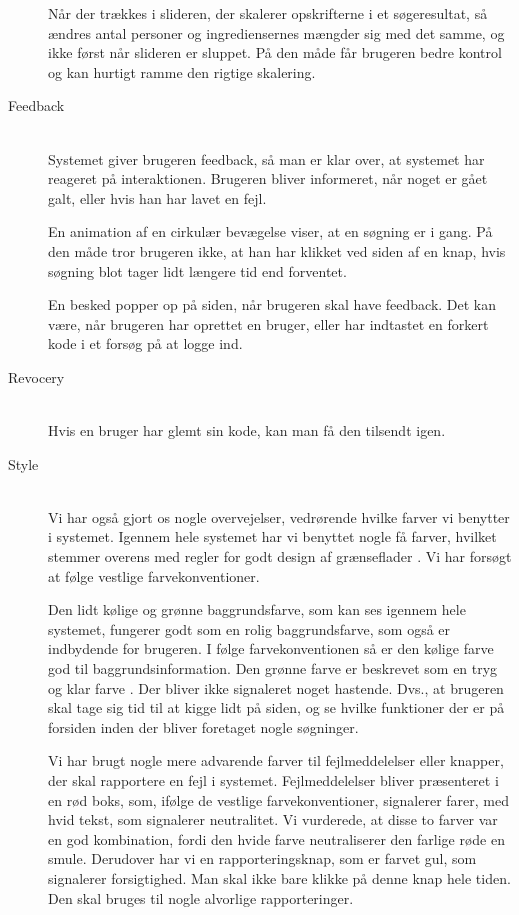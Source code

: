\begin{description}
Når der trækkes i slideren, der skalerer opskrifterne i et søgeresultat, så ændres antal personer og ingrediensernes mængder sig med det samme, og ikke først når slideren er sluppet. På den måde får brugeren bedre kontrol og kan hurtigt ramme den rigtige skalering.

\item[Feedback] \hfill \\
Systemet giver brugeren feedback, så man er klar over, at systemet har reageret på interaktionen. Brugeren bliver informeret, når noget er gået galt, eller hvis han har lavet en fejl.

En animation af en cirkulær bevægelse viser, at en søgning er i gang. På den måde tror brugeren ikke, at han har klikket ved siden af en knap, hvis søgning blot tager lidt længere tid end forventet.

En besked popper op på siden, når brugeren skal have feedback. Det kan \fx være, når brugeren har oprettet en bruger, eller har indtastet en forkert kode i et forsøg på at logge ind.

\item[Revocery] \hfill \\
Hvis en bruger har glemt sin kode, kan man få den tilsendt igen.

\item[Style] \hfill \\
Vi har også gjort os nogle overvejelser, vedrørende hvilke farver vi benytter i systemet. Igennem hele systemet har vi benyttet nogle få farver, hvilket stemmer overens med regler for godt design af grænseflader \cite[s. ~344]{deb}. Vi har forsøgt at følge vestlige farvekonventioner. 

Den lidt kølige og grønne baggrundsfarve, som kan ses igennem hele systemet, fungerer godt som en rolig baggrundsfarve, som også er indbydende for brugeren. I følge farvekonventionen så er den kølige farve god til baggrundsinformation. Den grønne farve er beskrevet som en tryg og klar farve \cite[s. ~344]{deb}. Der bliver ikke signaleret noget hastende. Dvs., at brugeren skal tage sig tid til at kigge lidt på siden, og se hvilke funktioner der er på forsiden inden der bliver foretaget nogle søgninger.

Vi har brugt nogle mere advarende farver til \fx fejlmeddelelser eller knapper, der skal rapportere en fejl i systemet. Fejlmeddelelser bliver præsenteret i en rød boks, som, ifølge de vestlige farvekonventioner, signalerer farer, med hvid tekst, som signalerer neutralitet. Vi vurderede, at disse to farver var en god kombination, fordi den hvide farve neutraliserer den farlige røde en smule. Derudover har vi en rapporteringsknap, som er farvet gul, som signalerer forsigtighed. Man skal ikke bare klikke på denne knap hele tiden. Den skal bruges til nogle alvorlige rapporteringer.


\end{description}

